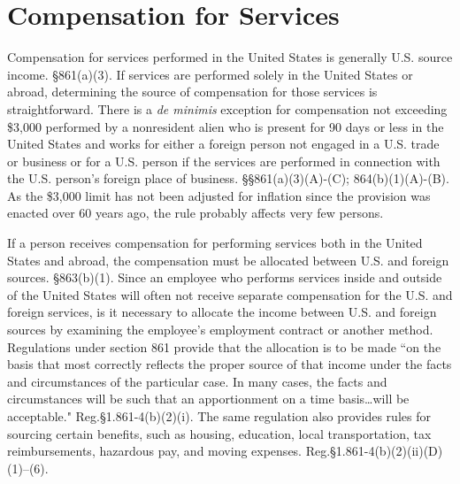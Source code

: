  \section{Compensation for Services}

Compensation for services performed in the United States is generally U.S. source income.  \S861(a)(3).  If services are performed solely in the United States or abroad, determining the source of compensation for those services is straightforward.  There is a \emph{de minimis} exception for compensation not exceeding \$3,000 performed by a nonresident alien who is present for 90 days or less in the United States and works for either a foreign person not engaged in a U.S. trade or business or for a U.S. person if the services are performed in connection with the U.S. person's foreign place of business.  \S\S 861(a)(3)(A)-(C); 864(b)(1)(A)-(B).  As the \$3,000 limit has not been adjusted for inflation since the provision was enacted over 60 years ago, the rule probably affects very few persons.  

If a person receives compensation for performing services both in the United States and abroad, the compensation must be allocated between U.S. and foreign sources. \S863(b)(1).  Since an employee who performs services inside and outside of the United States will often not receive separate compensation for the U.S. and foreign services, is it necessary to allocate the income between U.S. and foreign sources by examining the employee's employment contract or another method.  Regulations under section 861 provide that the allocation is to be made ``on the basis that most correctly reflects the proper source of that income under the facts and circumstances of the particular case.  In many cases, the facts and circumstances will be such that an apportionment on a time basis\ldots will be acceptable."  Reg.\@ \S1.861-4(b)(2)(i).  The same regulation also provides rules for sourcing certain benefits, such as housing, education, local transportation, tax reimbursements, hazardous pay, and moving expenses.    Reg.\@ \S1.861-4(b)(2)(ii)(D)(1)--(6).

